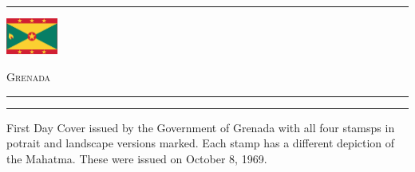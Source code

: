 \documentclass[a4paper]{article}
\begin{document}
\hrule
\vspace{8pt}
\begin{minipage}{2cm}
  \includegraphics[height=1.2cm]{images/gd}
\end{minipage}
\hfill
{\scshape\huge Grenada}
\vspace{8pt}
\hrule
\vspace{12cm}
\begin{center}
  \begin{minipage}{10cm}
    \hrule \vspace{12pt} First Day Cover issued by the Government of
    Grenada with all four stamsps in potrait and landscape versions
    marked. Each stamp has a different depiction of the Mahatma. These
    were issued on October 8, 1969.
  \end{minipage}
\end{center}
\end{document}

